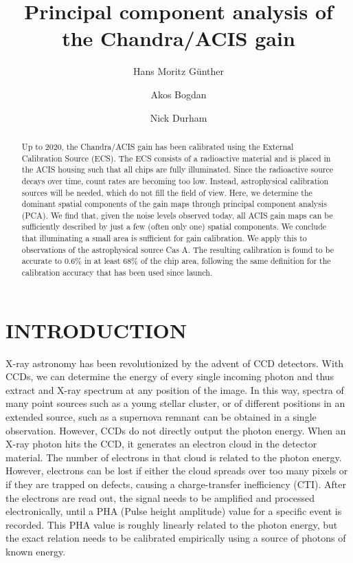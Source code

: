 \documentclass[]{spie}  %
\title{Principal component analysis of the Chandra/ACIS gain}
\author[a]{Hans Moritz G\"unther}
\author[b]{Akos Bogdan}
\author[b]{Nick Durham }
\affil[a]{MIT Kavli Institute for Astrophysics and Space Research, Massachusetts Institute of Technology, Cambridge, MA 02139, USA}
\affil[b]{Smithsonian Astrophysical Observatory, Cambridge, MA 02139, USA}
\begin{document}
\maketitle

\begin{abstract}
Up to 2020, the Chandra/ACIS gain has been calibrated using the External Calibration Source (ECS). The ECS consists of a radioactive material and is placed in the ACIS housing such that all chips are fully illuminated. Since the radioactive source decays over time, count rates are becoming too low. Instead, astrophysical calibration sources will be needed, which do not fill the field of view. Here, we determine the dominant spatial components of the gain maps through principal component analysis (PCA). We find that, given the noise levels observed today, all ACIS gain maps can be sufficiently described by just a few (often only one) spatial components. We conclude that illuminating a small area is sufficient for gain calibration. We apply this to observations of the astrophysical source Cas A. The resulting calibration is found to be accurate to 0.6\% in at least 68\% of the chip area, following the same definition for the calibration accuracy that has been used since launch.
\end{abstract}



\section{INTRODUCTION}
\label{sec:intro}
X-ray astronomy has been revolutionized by the advent of CCD detectors. With CCDs, we can determine the energy of every single incoming photon and thus extract and X-ray spectrum at any position of the image. In this way, spectra of many point sources such as a young stellar cluster, or of different positions in an extended source, such as a supernova remnant can be obtained in a single observation. However, CCDs do not directly output the photon energy. When an X-ray photon hits the CCD, it generates an electron cloud in the detector material. The number of electrons in that cloud is related to the photon energy. However, electrons can be lost if either the cloud spreads over too many pixels or if they are trapped on defects, causing a charge-transfer inefficiency (CTI)\cite{2002NIMPA.486..751T,GrantCTI}. After the electrons are read out, the signal needs to be amplified and processed electronically, until a PHA (Pulse height amplitude) value for a specific event is recorded. This PHA value is roughly linearly related to the photon energy, but the exact relation needs to be calibrated empirically using a source of photons of known energy.
\end{document}
